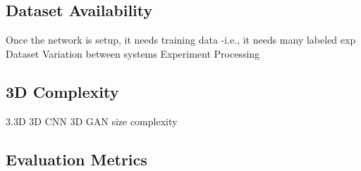 \subsection{Dataset Availability}
Once the network is setup, it needs training data -i.e., it needs many labeled exp
Dataset
	Variation between systems 
	Experiment
	Processing

\subsection{3D Complexity}
3.3D
3D CNN %
3D GAN size complexity


\subsection{Evaluation Metrics}


